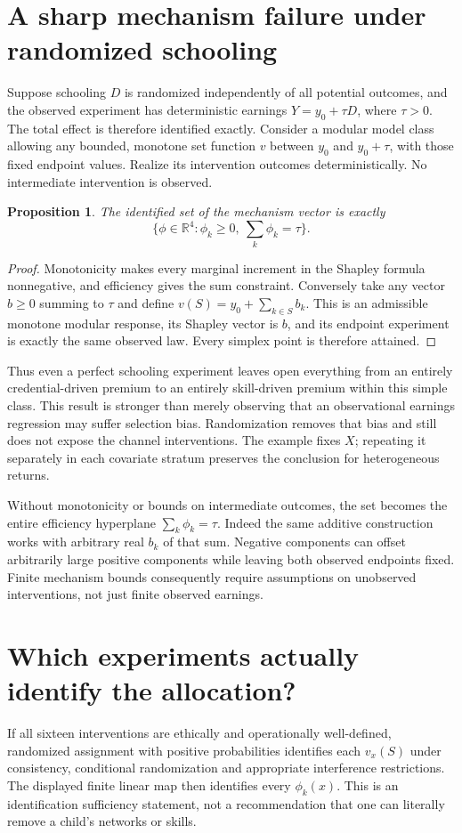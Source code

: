 \documentclass[11pt,a4paper]{article}
\newtheorem{proposition}[theorem]{Proposition}
\newcommand{\R}{\mathbb R}
\begin{document}
\section{A sharp mechanism failure under randomized schooling}
Suppose schooling $D$ is randomized independently of all potential outcomes, and the observed experiment has deterministic earnings $Y=y_0+\tau D$, where $\tau>0$. The total effect is therefore identified exactly. Consider a modular model class allowing any bounded, monotone set function $v$ between $y_0$ and $y_0+\tau$, with those fixed endpoint values. Realize its intervention outcomes deterministically. No intermediate intervention is observed.
\begin{proposition}
The identified set of the mechanism vector is exactly
\[
 \{\phi\in\R^4:\phi_k\ge0,\ \sum_k\phi_k=\tau\}.
\]
\end{proposition}
\begin{proof}
Monotonicity makes every marginal increment in the Shapley formula nonnegative, and efficiency gives the sum constraint. Conversely take any vector $b\ge0$ summing to $\tau$ and define
$v(S)=y_0+\sum_{k\in S}b_k$. This is an admissible monotone modular response, its Shapley vector is $b$, and its endpoint experiment is exactly the same observed law. Every simplex point is therefore attained.
\end{proof}
Thus even a perfect schooling experiment leaves open everything from an entirely credential-driven premium to an entirely skill-driven premium within this simple class. This result is stronger than merely observing that an observational earnings regression may suffer selection bias. Randomization removes that bias and still does not expose the channel interventions. The example fixes $X$; repeating it separately in each covariate stratum preserves the conclusion for heterogeneous returns.

Without monotonicity or bounds on intermediate outcomes, the set becomes the entire efficiency hyperplane $\sum_k\phi_k=\tau$. Indeed the same additive construction works with arbitrary real $b_k$ of that sum. Negative components can offset arbitrarily large positive components while leaving both observed endpoints fixed. Finite mechanism bounds consequently require assumptions on unobserved interventions, not just finite observed earnings.

\section{Which experiments actually identify the allocation?}
If all sixteen interventions are ethically and operationally well-defined, randomized assignment with positive probabilities identifies each $v_x(S)$ under consistency, conditional randomization and appropriate interference restrictions. The displayed finite linear map then identifies every $\phi_k(x)$. This is an identification sufficiency statement, not a recommendation that one can literally remove a child's networks or skills.
\end{document}
